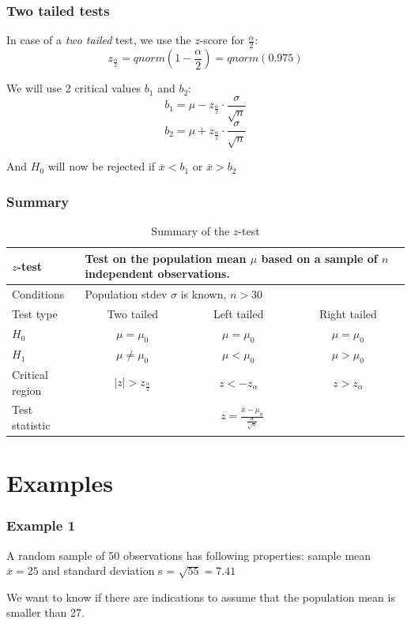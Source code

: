 \documentclass{beamer}
\begin{document}
\begin{frame}
  \frametitle{Two tailed tests}
  In case of a \emph{two tailed} test, we use the $z$-score for $\frac{\alpha}{2}$:
  \[ z_{\frac{\alpha}{2}} = qnorm(1-\frac{\alpha}{2})=qnorm(0.975) \]

  We will use 2 critical values $b_1$ and $b_2$:
  \[ b_1 = \mu - z_\frac{\alpha}{2} \cdot \frac{\sigma}{\sqrt{n}} \]
  \[ b_2 = \mu + z_\frac{\alpha}{2} \cdot \frac{\sigma}{\sqrt{n}} \]

  And $H_0$ will now be rejected if $\overline{x}<b_1$ or $\overline{x}>b_2$
\end{frame}

\begin{frame}
  \frametitle{Summary}

\begin{table}
  \centering
  \begin{tabular}{l|ccc}
    \toprule
    $z$-test              & \multicolumn{3}{l}{\parbox{.7\textwidth}{Test on the population mean $\mu$ based on a sample of $n$ \textbf{independent} observations.}} \\
    \midrule
    Conditions        & \multicolumn{3}{l}{\parbox{.7\textwidth}{Population stdev $\sigma$ is known, $n>30$}} \\
    \midrule
    Test type         & Two tailed           & Left tailed & Right tailed \\
    \midrule
    $H_{0}$           & $\mu = \mu_{0}$      & $\mu = \mu_{0}$ & $\mu = \mu_{0}$  \\
    $H_{1}$           & $\mu \neq \mu_{0}$   & $\mu < \mu_{0}$ & $\mu > \mu_{0}$  \\
    Critical region   & $\left|z\right| > z_\frac{\alpha}{2}$ & $z< -z_\alpha $        & $z>z_\alpha$            \\
    Test statistic    & \multicolumn{3}{c}{$z = \frac{\overline{x} - \mu_{0}}{\frac{\sigma}{\sqrt{n}}}$} \\
    \bottomrule
  \end{tabular}
  \caption{Summary of the $z$-test}
  \label{tab:toetsingsprocedures}
\end{table}
\end{frame}

\section{Examples}
\sectionframelogo{}

\begin{frame}
  \frametitle{Example 1}
  A random sample of 50 observations has following properties: sample mean $\overline{x} = 25$ and standard deviation s = $\sqrt{55} = 7.41$
  
  We want to know if there are indications to assume that the population mean is smaller than 27.
\end{frame}
\end{document}
